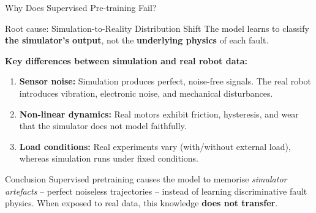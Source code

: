 \documentclass{beamer}
\begin{document}
\begin{frame}{Why Does Supervised Pre-training Fail?}

    \begin{alertblock}{Root cause: Simulation-to-Reality Distribution Shift}
        The model learns to classify \textbf{the simulator's output}, not the \textbf{underlying physics} of each fault.
    \end{alertblock}

    \vspace{0.3cm}
    \textbf{Key differences between simulation and real robot data:}

    \begin{enumerate}
        \item \textbf{Sensor noise:} Simulation produces perfect, noise-free signals. The real robot introduces vibration, electronic noise, and mechanical disturbances.
        \item \textbf{Non-linear dynamics:} Real motors exhibit friction, hysteresis, and wear that the simulator does not model faithfully.
        \item \textbf{Load conditions:} Real experiments vary (with/without external load), whereas simulation runs under fixed conditions.
    \end{enumerate}

    \vspace{0.2cm}
    \begin{exampleblock}{Conclusion}
        Supervised pretraining causes the model to memorise \textit{simulator artefacts} -- perfect noiseless trajectories -- instead of learning discriminative fault physics. When exposed to real data, this knowledge \textbf{does not transfer}.
    \end{exampleblock}
\end{frame}
\end{document}
